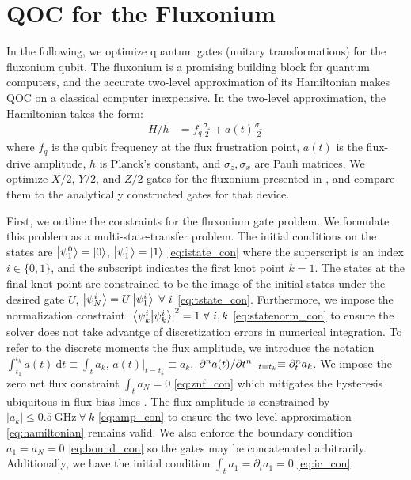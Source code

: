 \section{QOC for the Fluxonium \label{sec:fluxonium}}
In the following, we optimize quantum gates
(unitary transformations) for the fluxonium qubit.
The fluxonium is a promising building block
for quantum computers, and the accurate
two-level approximation of its Hamiltonian makes
QOC on a classical computer inexpensive.
In the two-level
approximation, the Hamiltonian takes the form:
\begin{align}
  H/h &= f_{q} \frac{\sigma_{z}}{2} + a(t) \frac{\sigma_{x}}{2}
  \label{eq:hamiltonian}
\end{align}
where $f_{q}$ is the qubit frequency at the flux frustration point,
$a(t)$ is the flux-drive amplitude, $h$ is Planck's constant, and $\sigma_{z}, \sigma_{x}$
are Pauli matrices. We optimize $X/2$, $Y/2$, and
$Z/2$ gates for the fluxonium presented in \cite{zhang2020universal},
and compare them to the analytically constructed gates for
that device.

First, we outline the constraints for the fluxonium gate problem.
We formulate this problem as a multi-state-transfer problem.
The initial conditions on
the states are $\ket{\psi^{0}_{1}} = \ket{0}$, $\ket{\psi^{1}_{1}} = \ket{1}$
\eqref{eq:istate_con}
where the superscript is an index $i \in \{0, 1\}$,
and the subscript indicates the first knot point $k = 1$.
The states at the final knot point are constrained to be
the image of the initial states under the desired gate $U$,
$\ket{\psi^{i}_{N}} = U \ket{\psi^{i}_{1}} \ \forall \ i$
\eqref{eq:tstate_con}.
Furthermore, we impose the normalization constraint
${\lvert \braket{\psi^{i}_{k}}{\psi^{i}_{k}} \rvert}^{2} = 1 \ \forall \ i,k$
\eqref{eq:statenorm_con}
to ensure the solver does not take advantge of discretization errors in numerical integration.
To refer to the discrete moments the flux amplitude, we introduce the notation
$\int^{t_{k}}_{t_{1}} a(t) \ \mathrm{d}t \equiv \int_{t} a_{k}$,
$a(t) \lvert_{t = t_{k}} \equiv a_{k}$,
$\pdv*[n]{a(t)}{t} \lvert_{t = t_{k}} \equiv \partial^{n}_{t} a_{k}$.
We impose the zero net flux constraint $\int_{t} a_{N} = 0$
\eqref{eq:znf_con}
which mitigates the hysteresis ubiquitous in flux-bias lines
\cite{battistel2019fast, krantz2019quantum, zhang2020universal}.
The flux amplitude is constrained by $\lvert a_{k} \rvert \leq 0.5 \ \textrm{GHz} \ \forall \ k$
\eqref{eq:amp_con}
to ensure the two-level approximation \eqref{eq:hamiltonian} remains valid.
We also enforce the boundary condition $a_{1} = a_{N} = 0$ \eqref{eq:bound_con}
so the gates may be concatenated arbitrarily. Additionally,
we have the initial condition $\int_{t} a_{1} = \partial_{t} a_{1} = 0$
\eqref{eq:ic_con}.

